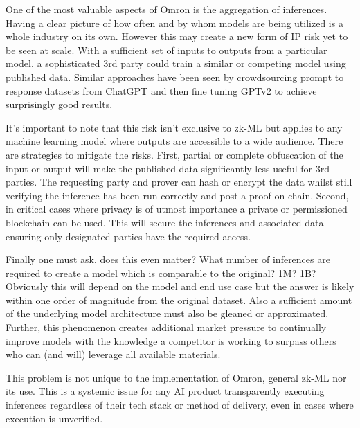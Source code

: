 \documentclass[conference]{IEEEtran}
\begin{document}
One of the most valuable aspects of Omron is the aggregation of inferences. Having a clear picture of how often and by whom models are being utilized is a whole industry on its own. However this may create a new form of IP risk yet to be seen at scale. With a sufficient set of inputs to outputs from a particular model, a sophisticated 3rd party could train a similar or competing model using published data.
Similar approaches have been seen by crowdsourcing prompt to response datasets from ChatGPT and then fine tuning GPTv2 to achieve surprisingly good results.

It's important to note that this risk isn't exclusive to zk-ML but applies to any machine learning model where outputs are accessible to a wide audience. There are strategies to mitigate the risks.  First, partial or complete obfuscation of the input or output will make the published data significantly less useful for 3rd parties. The requesting party and prover can hash or encrypt the data whilst still verifying the inference has been run correctly and post a proof on chain.  Second, in critical cases where privacy is of utmost importance a private or permissioned blockchain can be used. This will secure the inferences and associated data ensuring only designated parties have the required access.

Finally one must ask, does this even matter? What number of inferences are required to create a model which is comparable to the original? 1M? 1B? Obviously this will depend on the model and end use case but the answer is likely within one order of magnitude from the original dataset. Also a sufficient amount of the underlying model architecture must also be gleaned or approximated. Further, this phenomenon creates additional market pressure to continually improve models with the knowledge a competitor is working to surpass others who can (and will) leverage all available materials.

This problem is not unique to the implementation of Omron, general zk-ML nor its use. This is a systemic issue for any AI product transparently executing inferences regardless of their tech stack or method of delivery, even in cases where execution is unverified.
\end{document}
